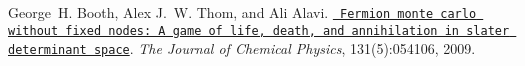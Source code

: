 
\begin{DoxyDescription}
\item[\label{citelist_CITEREF_doi:10.1063/1.3193710}%
\Hypertarget{citelist_CITEREF_doi:10.1063/1.3193710}%
\mbox{[}1\mbox{]}]George~H. Booth, Alex J.~W. Thom, and Ali Alavi. \href{https://aip.scitation.org/doi/abs/10.1063/1.3193710}{\texttt{ Fermion monte carlo without fixed nodes\+: A game of life, death, and annihilation in slater determinant space}}. {\itshape The Journal of Chemical Physics}, 131(5)\+:054106, 2009. 


\end{DoxyDescription}